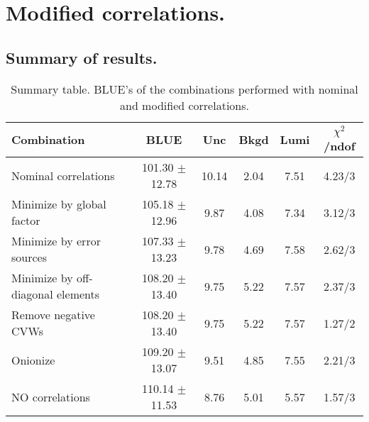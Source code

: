 \section{Modified correlations.}
\subsection{Summary of results.}
\begin{table}[h]
\scriptsize
\begin{center}
\renewcommand{\arraystretch}{1.1}
\begin{tabular}{|l|c|ccc|c|}
\hline
Combination & BLUE & {\tiny Unc} & {\tiny Bkgd} & {\tiny Lumi} & {\tiny$\chi^2$/ndof} \\
\hline
Nominal correlations &     101.30 $\pm$     12.78 &      10.14 &       2.04 &       7.51 &       4.23/3\\
\hline
Minimize by global factor &     105.18 $\pm$     12.96 &       9.87 &       4.08 &       7.34 &       3.12/3\\
Minimize by error sources &     107.33 $\pm$     13.23 &       9.78 &       4.69 &       7.58 &       2.62/3\\
Minimize by off-diagonal elements &     108.20 $\pm$     13.40 &       9.75 &       5.22 &       7.57 &       2.37/3\\
Remove negative CVWs &     108.20 $\pm$     13.40 &       9.75 &       5.22 &       7.57 &       1.27/2\\
Onionize &     109.20 $\pm$     13.07 &       9.51 &       4.85 &       7.55 &       2.21/3\\
\hline
NO correlations &     110.14 $\pm$     11.53 &       8.76 &       5.01 &       5.57 &       1.57/3\\
\hline
\end{tabular}
\renewcommand{\arraystretch}{1}
\caption{Summary table. BLUE's of the combinations performed with nominal and modified correlations.}
\end{center}
\end{table}

\clearpage
